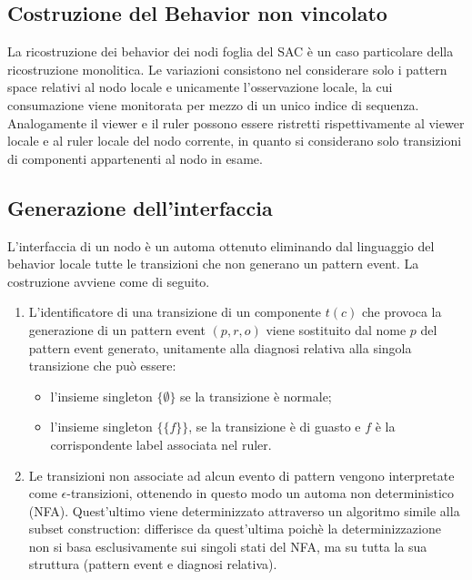 \subsection{Costruzione del Behavior non vincolato}
La ricostruzione dei behavior dei nodi foglia del SAC è un caso particolare della ricostruzione monolitica. Le variazioni consistono nel considerare solo i pattern space relativi al nodo locale e unicamente l'osservazione locale, la cui consumazione viene monitorata per mezzo di un unico indice di sequenza. Analogamente il viewer e il ruler possono essere ristretti rispettivamente al viewer locale e al ruler locale del nodo corrente, in quanto si considerano solo transizioni di componenti appartenenti al nodo in esame.

\subsection{Generazione dell'interfaccia}
L'interfaccia di un nodo è un automa ottenuto eliminando dal linguaggio del behavior locale tutte le transizioni che non generano un pattern event.
La costruzione avviene come di seguito.
\begin{enumerate}
\item L'identificatore di una transizione di un componente $t(c)$ che provoca la generazione di un pattern event $(p,r,o)$ viene sostituito dal nome $p$ del pattern event generato, unitamente alla diagnosi relativa alla singola transizione che può essere:
\begin{itemize}
\item l'insieme singleton $\{\emptyset\}$ se la transizione è normale;
\item l'insieme singleton $\{\{f\}\}$, se la transizione è di guasto e $f$ è la corrispondente label associata nel ruler.
\end{itemize}
\item Le transizioni non associate ad alcun evento di pattern vengono interpretate come $\epsilon$-transizioni, ottenendo in questo modo un automa non deterministico (NFA). Quest'ultimo viene determinizzato attraverso un algoritmo simile alla subset construction: differisce da quest'ultima poichè la determinizzazione non si basa esclusivamente sui singoli stati del NFA, ma su tutta la sua struttura (pattern event e diagnosi relativa).
\end{enumerate}

